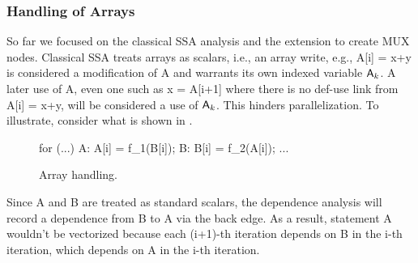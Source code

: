 
\subsubsection{Handling of Arrays}
\label{sec:arrayhandling}

So far we focused on the classical SSA analysis and the extension to create MUX nodes. 
Classical SSA treats arrays as scalars, i.e., an array write, e.g., {\sf A[i] = x+y} is considered
a modification of {\sf A} and warrants its own indexed variable ${\sf A}_k$. A later use of {\sf A}, 
even one such as {\sf x = A[i+1]} where there is no def-use link from {\sf A[i] = x+y}, will be 
considered a use of ${\sf A}_k$. This hinders parallelization. To illustrate, consider 
what is shown in .

\begin{figure}[H]
\centering
\begin{minipage}{0.7\textwidth}
\begin{javacode}
for (...) {
  A: A[i] = f_1(B[i]);
  B: B[i] = f_2(A[i]);
  ...
}
\end{javacode}
\end{minipage}
\caption{Array handling.}
\label{fig:arrayhand}
\end{figure}

Since {\sf A} and {\sf B} are treated as standard scalars, the dependence analysis will record
a dependence from {\sf B} to {\sf A} via the back edge. As a result, statement {\sf A} wouldn't 
be vectorized because each (i+1)-th iteration depends on {\sf B} in the i-th iteration,
which depends on {\sf A} in the i-th iteration. 

